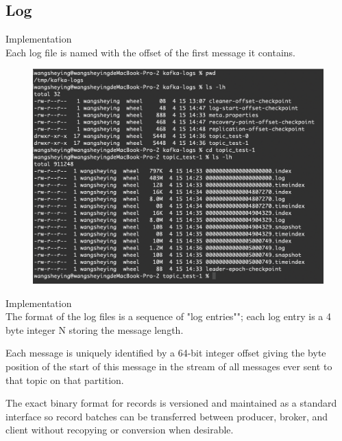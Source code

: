 \subsection{Log}
\begin{frame}[plain,t]{Implementation} %
     \\
    \vspace{2ex}
     Each log file is named with the offset of the first message it contains.
    \begin{figure}
        \centering
        \includegraphics[width=0.8\linewidth]{image/0307}
        \label{fig:0307}
    \end{figure}
    
    
    
\end{frame}

\begin{frame}[plain,t]{Implementation} %
     \\
    \vspace{2ex}
  The format of the log files is a sequence of "log entries""; each log entry is a 4 byte integer N storing the message length.
  
  \vspace{2ex}
  Each message is uniquely identified by a 64-bit integer offset giving the byte position of the start of this message in the stream of all messages ever sent to that topic on that partition.
    
    
     \vspace{2ex}
     The exact binary format for records is versioned and maintained as a standard interface so record batches can be transferred between producer, broker, and client without recopying or conversion when desirable.
    
    
    
\end{frame}

